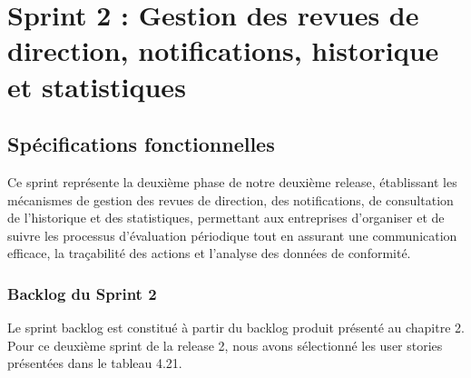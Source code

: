 \section{Sprint 2 : Gestion des revues de direction, notifications, historique et statistiques}

\subsection{Spécifications fonctionnelles}
\noindent Ce sprint représente la deuxième phase de notre deuxième release, établissant les mécanismes de gestion des revues de direction, des notifications, de consultation de l'historique et des statistiques, permettant aux entreprises d'organiser et de suivre les processus d'évaluation périodique tout en assurant une communication efficace, la traçabilité des actions et l'analyse des données de conformité.

\subsubsection{Backlog du Sprint 2}
\noindent Le sprint backlog est constitué à partir du backlog produit présenté au chapitre 2. Pour ce deuxième sprint de la release 2, nous avons sélectionné les user stories présentées dans le tableau 4.21.

